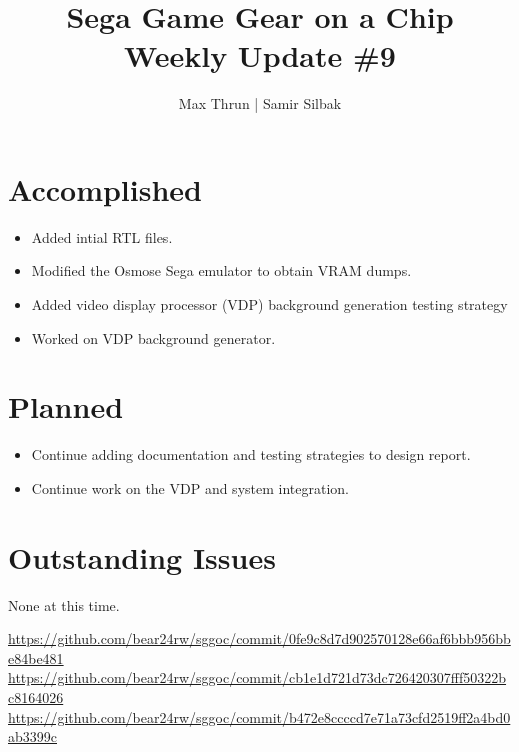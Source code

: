 \documentclass[12pt]{article}
\title{Sega Game Gear on a Chip \\ Weekly Update \#9}
\author{ Max Thrun | Samir Silbak }
\begin{document}
\maketitle

\section*{Accomplished}
\begin{itemize}
    \item Added intial RTL files. \cite{rtl}
    \item Modified the Osmose Sega emulator to obtain VRAM dumps. \cite{dumps}
    \item Added video display processor (VDP) background generation testing strategy \cite{testing}
    \item Worked on VDP background generator.
\end{itemize}

\section*{Planned}
\begin{itemize}
    \item Continue adding documentation and testing strategies to design report.
    \item Continue work on the VDP and system integration.
\end{itemize}

\section*{Outstanding Issues}
None at this time.

\vspace{.1in}
\begin{thebibliography}{9}
     \url{https://github.com/bear24rw/sggoc/commit/0fe9c8d7d902570128e66af6bbb956bbe84be481}
     \url{https://github.com/bear24rw/sggoc/commit/cb1e1d721d73dc726420307fff50322bc8164026}
     \url{https://github.com/bear24rw/sggoc/commit/b472e8ccccd7e71a73cfd2519ff2a4bd0ab3399c}
\end{thebibliography}
\end{document}
